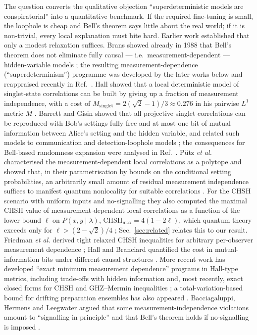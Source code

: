 \documentclass[aps,pra,reprint,superscriptaddress,floatfix]{revtex4-2}
\begin{document}
The question converts the qualitative objection ``superdeterministic models
are conspiratorial'' into a quantitative benchmark. If the required
fine-tuning is small, the loophole is cheap and Bell's theorem says little
about the real world; if it is non-trivial, every local explanation must bite
hard. Earlier work established that only a modest relaxation suffices. Brans
showed already in 1988 that Bell's theorem does not eliminate fully causal
--- i.e.\ measurement-dependent --- hidden-variable models \cite{brans1988};
the resulting measurement-dependence (``superdeterminism'') programme was
developed by the later works below and reappraised recently in
Ref.~. Hall showed that a local deterministic model of
singlet-state correlations can be built by giving up a fraction of
measurement independence, with a cost of
$M_{\mathrm{singlet}}=2(\sqrt{2}-1)/3\approx 0.276$ in his pairwise
$L^1$ metric $M$ \cite{hall2010}. Barrett and Gisin showed that all
projective singlet correlations can be reproduced with Bob's settings fully
free and at most one bit of mutual information between Alice's setting and
the hidden variable, and related such models to communication and
detection-loophole models \cite{barrettgisin2011}; the consequences for
Bell-based randomness expansion were analysed in Ref.~.
P\"utz \emph{et al.} characterised the measurement-dependent local
correlations as a polytope and showed that, in their parametrisation by
bounds on the conditional setting probabilities, an arbitrarily small
amount of residual measurement independence suffices to manifest quantum
nonlocality for suitable correlations \cite{putz2014,putzgisin2016}. For
the CHSH scenario with uniform inputs and no-signalling they also computed
the maximal CHSH value of measurement-dependent local correlations as a
function of the lower bound $\ell$ on $P(x,y\mid\lambda)$,
$\mathrm{CHSH}_{\max}=4(1-2\ell)$, which quantum theory exceeds only for
$\ell>(2-\sqrt2)/4$ \cite{putz2014,putzgisin2016}; Sec.~\ref{sec:related}
relates this to our result.
Friedman \emph{et al.} derived tight relaxed
CHSH inequalities for arbitrary per-observer measurement dependence
\cite{fghk2019}; Hall and Branciard quantified the cost in mutual-information
bits under different causal structures \cite{hallbranciard2020}. More recent
work has developed ``exact minimum measurement dependence'' programs in
Hall-type metrics, including trade-offs with hidden information
\cite{takakura2022} and, most recently, exact closed forms for CHSH and
GHZ--Mermin inequalities \cite{alai2026a,alai2026b}; a total-variation-based
bound for drifting preparation ensembles has also appeared
\cite{pal2026}. Bacciagaluppi, Hermens and Leegwater argued that some
measurement-independence violations amount to ``signalling in principle'' and
that Bell's theorem holds if no-signalling is imposed \cite{bhl2026}.
\end{document}
